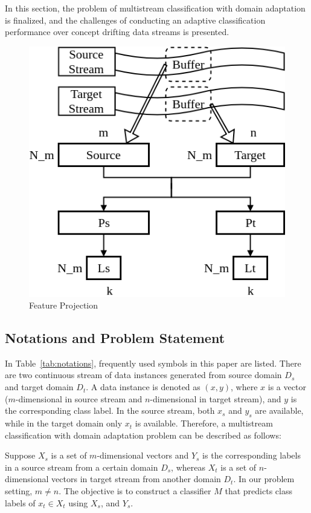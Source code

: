 In this section, the problem of multistream classification with domain adaptation is finalized, and the challenges of conducting an adaptive classification performance over concept drifting data streams is presented.

\begin{figure}[t]
\centering
\includegraphics[width=0.7\columnwidth]{Figures/domain_adaptation.png}
\caption{Feature Projection}
\label{fig:domainadaptation}
\end{figure}


\subsection{Notations and Problem Statement}
\label{subsec: problemstatement}

In Table~\ref{tab:notations}, frequently used symbols in this paper are listed. There are two 
continuous stream of data instances generated from source domain $D_{s}$ and target domain $D_{t}$.
A data instance is denoted as $(x, y)$, where $x$ is a vector ($m$-dimensional in 
source stream and $n$-dimensional in target stream), and $y$ is the 
corresponding class label. In the source stream, both $x_{s}$ and $y_{s}$  are available, while in the target domain only $x_{t}$ is available. Therefore, a multistream classification with domain adaptation problem can be described as follows:

Suppose $X_{s}$ is a set of $m$-dimensional vectors and $Y_{s}$ is the corresponding labels in a source stream from a certain domain $D_{s}$, 
whereas $X_{t}$ is a set of $n$-dimensional vectors in target stream from another 
domain $D_{t}$. In our problem setting, $m\neq n$. The objective is to construct a classifier $M$ that
predicts class labels of $x_{t} \in X_{t}$ using $X_{s}$, and $Y_{s}$.

